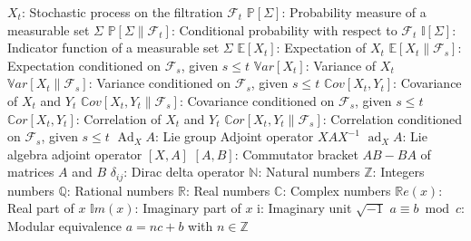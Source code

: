 \begin{tabbing}
	\addsymbol \mbox{$X_t$}: {Stochastic process on the filtration $\mathscr{F}_t$}
	\addsymbol \mbox{$\mathbb{P}\left[\Sigma \right]$}: {Probability measure of a measurable set $\Sigma$}
	\addsymbol \mbox{$\mathbb{P}\left[\Sigma \parallel \mathscr{F}_t \right]$}: {Conditional probability with respect to $\mathscr{F}_t$}
	\addsymbol \mbox{$\mathbb{I}\left[\Sigma\right]$}: {Indicator function of a measurable set $\Sigma$}
	\addsymbol \mbox{$\mathbb{E}\left[X_t\right]$}: {Expectation of $X_t$}
	\addsymbol \mbox{$\mathbb{E}\left[X_t \parallel \mathscr{F}_s\right]$}: {Expectation conditioned on $\mathscr{F}_s$, given $s \leq t$}
	\addsymbol \mbox{$\mathbb{V}ar\left[X_t\right]$}: {Variance of $X_t$}
	\addsymbol \mbox{$\mathbb{V}ar\left[X_t \parallel \mathscr{F}_s\right]$}: {Variance  conditioned on $\mathscr{F}_s$, given $s \leq t$}
	\addsymbol \mbox{$\mathbb{C}ov\left[X_t, Y_t\right]$}: {Covariance of $X_t$ and $Y_t$}
	\addsymbol \mbox{$\mathbb{C}ov\left[X_t, Y_t \parallel \mathscr{F}_s\right]$}: {Covariance  conditioned on $\mathscr{F}_s$, given $s \leq t$}
	\addsymbol \mbox{$\mathbb{C}or\left[X_t, Y_t\right]$}: {Correlation of $X_t$ and $Y_t$}
	\addsymbol \mbox{$\mathbb{C}or\left[X_t, Y_t \parallel \mathscr{F}_s\right]$}: {Correlation  conditioned on $\mathscr{F}_s$, given $s \leq t$}
	\addsymbol \mbox{$\operatorname{Ad}_X A$}: {Lie group Adjoint operator $XAX^{-1}$}
	\addsymbol \mbox{$\operatorname{ad}_X A$}: {Lie algebra adjoint operator $\left[X,A\right]$}
	\addsymbol \mbox{$\left[A,B\right]$}: {Commutator bracket $AB - BA$ of matrices $A$ and $B$}
	\addsymbol \mbox{$\delta_{ij}$}: {Dirac delta operator}
	\addsymbol \mbox{$\mathbb{N}$}: {Natural numbers}
	\addsymbol \mbox{$\mathbb{Z}$}: {Integers numbers}
	\addsymbol \mbox{$\mathbb{Q}$}: {Rational numbers}
	\addsymbol \mbox{$\mathbb{R}$}: {Real numbers}
	\addsymbol \mbox{$\mathbb{C}$}: {Complex numbers}
	\addsymbol \mbox{$\mathbb{R}e\left(x\right)$}: {Real part of $x$}
	\addsymbol \mbox{$\mathbb{I}m\left(x\right)$}: {Imaginary part of $x$}
	\addsymbol \mbox{$\mathrm{i}$}: {Imaginary unit $\sqrt{-1}$}
	\addsymbol \mbox{$a \equiv b \bmod c$}: {Modular equivalence $a = nc + b$ with $n \in \mathbb{Z}$}
\end{tabbing}